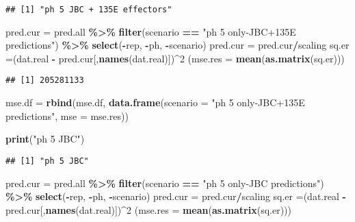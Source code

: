 \documentclass[
]{article}
\newenvironment{Shaded}{\begin{snugshade}}{\end{snugshade}}
\newcommand{\AttributeTok}[1]{\textcolor[rgb]{0.13,0.29,0.53}{#1}}
\newcommand{\DecValTok}[1]{\textcolor[rgb]{0.00,0.00,0.81}{#1}}
\newcommand{\FunctionTok}[1]{\textcolor[rgb]{0.13,0.29,0.53}{\textbf{#1}}}
\newcommand{\NormalTok}[1]{#1}
\newcommand{\OtherTok}[1]{\textcolor[rgb]{0.56,0.35,0.01}{#1}}
\newcommand{\SpecialCharTok}[1]{\textcolor[rgb]{0.81,0.36,0.00}{\textbf{#1}}}
\newcommand{\StringTok}[1]{\textcolor[rgb]{0.31,0.60,0.02}{#1}}
\begin{document}
\begin{verbatim}
## [1] "ph 5 JBC + 135E effectors"
\end{verbatim}

\begin{Shaded}
\begin{Highlighting}[]
\NormalTok{pred.cur }\OtherTok{=}\NormalTok{ pred.all }\SpecialCharTok{\%\textgreater{}\%} 
  \FunctionTok{filter}\NormalTok{(scenario }\SpecialCharTok{==} \StringTok{"ph 5 only{-}JBC+135E predictions"}\NormalTok{) }\SpecialCharTok{\%\textgreater{}\%} 
  \FunctionTok{select}\NormalTok{(}\SpecialCharTok{{-}}\NormalTok{rep, }\SpecialCharTok{{-}}\NormalTok{ph, }\SpecialCharTok{{-}}\NormalTok{scenario)}
\NormalTok{pred.cur }\OtherTok{=}\NormalTok{ pred.cur}\SpecialCharTok{/}\NormalTok{scaling}
\NormalTok{sq.er }\OtherTok{=}\NormalTok{(dat.real }\SpecialCharTok{{-}}\NormalTok{ pred.cur[,}\FunctionTok{names}\NormalTok{(dat.real)])}\SpecialCharTok{\^{}}\DecValTok{2}
\NormalTok{(}\AttributeTok{mse.res =} \FunctionTok{mean}\NormalTok{(}\FunctionTok{as.matrix}\NormalTok{(sq.er)))}
\end{Highlighting}
\end{Shaded}

\begin{verbatim}
## [1] 205281133
\end{verbatim}

\begin{Shaded}
\begin{Highlighting}[]
\NormalTok{mse.df }\OtherTok{=} \FunctionTok{rbind}\NormalTok{(mse.df, }\FunctionTok{data.frame}\NormalTok{(}\AttributeTok{scenario =} \StringTok{"ph 5 only{-}JBC+135E predictions"}\NormalTok{,}
                                  \AttributeTok{mse =}\NormalTok{ mse.res))}

\FunctionTok{print}\NormalTok{(}\StringTok{"ph 5 JBC"}\NormalTok{)}
\end{Highlighting}
\end{Shaded}

\begin{verbatim}
## [1] "ph 5 JBC"
\end{verbatim}

\begin{Shaded}
\begin{Highlighting}[]
\NormalTok{pred.cur }\OtherTok{=}\NormalTok{ pred.all }\SpecialCharTok{\%\textgreater{}\%} 
  \FunctionTok{filter}\NormalTok{(scenario }\SpecialCharTok{==} \StringTok{"ph 5 only{-}JBC predictions"}\NormalTok{) }\SpecialCharTok{\%\textgreater{}\%} 
  \FunctionTok{select}\NormalTok{(}\SpecialCharTok{{-}}\NormalTok{rep, }\SpecialCharTok{{-}}\NormalTok{ph, }\SpecialCharTok{{-}}\NormalTok{scenario)}
\NormalTok{pred.cur }\OtherTok{=}\NormalTok{ pred.cur}\SpecialCharTok{/}\NormalTok{scaling}
\NormalTok{sq.er }\OtherTok{=}\NormalTok{(dat.real }\SpecialCharTok{{-}}\NormalTok{ pred.cur[,}\FunctionTok{names}\NormalTok{(dat.real)])}\SpecialCharTok{\^{}}\DecValTok{2}
\NormalTok{(}\AttributeTok{mse.res =} \FunctionTok{mean}\NormalTok{(}\FunctionTok{as.matrix}\NormalTok{(sq.er)))}
\end{Highlighting}
\end{Shaded}
\end{document}
